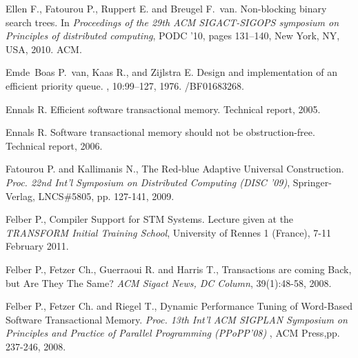 \begin{thebibliography}{99}
{
Ellen F., Fatourou P., Ruppert E. and Breugel F.~van.
\newblock Non-blocking binary search trees.
\newblock In {\em Proceedings of the 29th ACM SIGACT-SIGOPS symposium on
  Principles of distributed computing}, PODC '10, pages 131--140, New York, NY,
  USA, 2010. ACM.


Emde~Boas P.~van, Kaas R., and Zijlstra E.
\newblock Design and implementation of an efficient priority queue.
, 10:99--127, 1976.
/BF01683268.




Ennals R.
\newblock Efficient software transactional memory.
\newblock Technical report, 2005.

Ennals R.
\newblock Software transactional memory should not be obstruction-free.
\newblock Technical report, 2006.





Fatourou P. and Kallimanis N., 
The Red-blue Adaptive Universal Construction. 
{\it  Proc. 22nd  Int'l  Symposium on Distributed Computing
(DISC '09)},  Springer-Verlag, LNCS\#5805, pp. 127-141,  2009. 



Felber P., 
Compiler Support for STM Systems. 
Lecture given at the  {\it TRANSFORM  Initial Training School},  University
of Rennes  1 (France), 7-11 February 2011. 






Felber P., Fetzer Ch., Guerraoui R. and Harris T., 
Transactions are coming Back, but Are They The Same?
{\it ACM Sigact News, DC Column}, 39(1):48-58, 2008.

Felber P.,  Fetzer Ch. and  Riegel T., 
Dynamic Performance Tuning of Word-Based Software Transactional Memory. 
{\it  Proc. 13th  Int'l  ACM SIGPLAN Symposium on Principles and
 Practice of Parallel Programming (PPoPP'08) },  ACM Press,pp. 237-246,  2008. 




}
\end{thebibliography}
